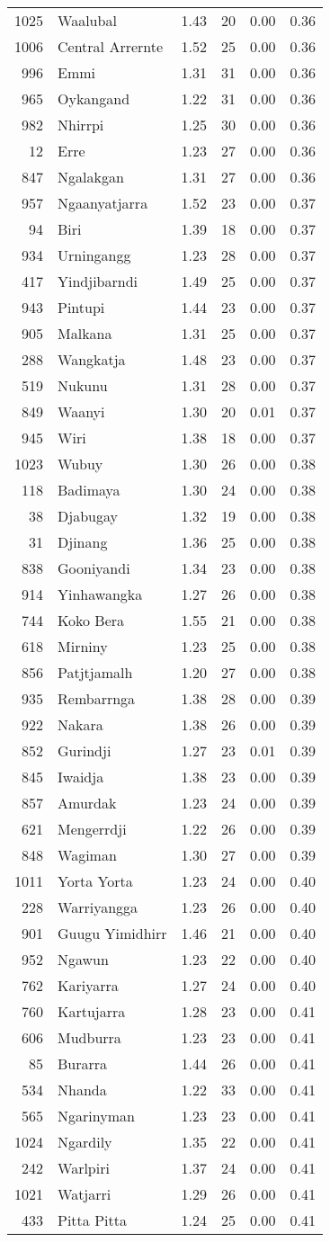\begin{longtable}[]{@{}rlrrrr@{}}
1025 & Waalubal & 1.43 & 20 & 0.00 & 0.36\tabularnewline
1006 & Central Arrernte & 1.52 & 25 & 0.00 & 0.36\tabularnewline
996 & Emmi & 1.31 & 31 & 0.00 & 0.36\tabularnewline
965 & Oykangand & 1.22 & 31 & 0.00 & 0.36\tabularnewline
982 & Nhirrpi & 1.25 & 30 & 0.00 & 0.36\tabularnewline
12 & Erre & 1.23 & 27 & 0.00 & 0.36\tabularnewline
847 & Ngalakgan & 1.31 & 27 & 0.00 & 0.36\tabularnewline
957 & Ngaanyatjarra & 1.52 & 23 & 0.00 & 0.37\tabularnewline
94 & Biri & 1.39 & 18 & 0.00 & 0.37\tabularnewline
934 & Urningangg & 1.23 & 28 & 0.00 & 0.37\tabularnewline
417 & Yindjibarndi & 1.49 & 25 & 0.00 & 0.37\tabularnewline
943 & Pintupi & 1.44 & 23 & 0.00 & 0.37\tabularnewline
905 & Malkana & 1.31 & 25 & 0.00 & 0.37\tabularnewline
288 & Wangkatja & 1.48 & 23 & 0.00 & 0.37\tabularnewline
519 & Nukunu & 1.31 & 28 & 0.00 & 0.37\tabularnewline
849 & Waanyi & 1.30 & 20 & 0.01 & 0.37\tabularnewline
945 & Wiri & 1.38 & 18 & 0.00 & 0.37\tabularnewline
1023 & Wubuy & 1.30 & 26 & 0.00 & 0.38\tabularnewline
118 & Badimaya & 1.30 & 24 & 0.00 & 0.38\tabularnewline
38 & Djabugay & 1.32 & 19 & 0.00 & 0.38\tabularnewline
31 & Djinang & 1.36 & 25 & 0.00 & 0.38\tabularnewline
838 & Gooniyandi & 1.34 & 23 & 0.00 & 0.38\tabularnewline
914 & Yinhawangka & 1.27 & 26 & 0.00 & 0.38\tabularnewline
744 & Koko Bera & 1.55 & 21 & 0.00 & 0.38\tabularnewline
618 & Mirniny & 1.23 & 25 & 0.00 & 0.38\tabularnewline
856 & Patjtjamalh & 1.20 & 27 & 0.00 & 0.38\tabularnewline
935 & Rembarrnga & 1.38 & 28 & 0.00 & 0.39\tabularnewline
922 & Nakara & 1.38 & 26 & 0.00 & 0.39\tabularnewline
852 & Gurindji & 1.27 & 23 & 0.01 & 0.39\tabularnewline
845 & Iwaidja & 1.38 & 23 & 0.00 & 0.39\tabularnewline
857 & Amurdak & 1.23 & 24 & 0.00 & 0.39\tabularnewline
621 & Mengerrdji & 1.22 & 26 & 0.00 & 0.39\tabularnewline
848 & Wagiman & 1.30 & 27 & 0.00 & 0.39\tabularnewline
1011 & Yorta Yorta & 1.23 & 24 & 0.00 & 0.40\tabularnewline
228 & Warriyangga & 1.23 & 26 & 0.00 & 0.40\tabularnewline
901 & Guugu Yimidhirr & 1.46 & 21 & 0.00 & 0.40\tabularnewline
952 & Ngawun & 1.23 & 22 & 0.00 & 0.40\tabularnewline
762 & Kariyarra & 1.27 & 24 & 0.00 & 0.40\tabularnewline
760 & Kartujarra & 1.28 & 23 & 0.00 & 0.41\tabularnewline
606 & Mudburra & 1.23 & 23 & 0.00 & 0.41\tabularnewline
85 & Burarra & 1.44 & 26 & 0.00 & 0.41\tabularnewline
534 & Nhanda & 1.22 & 33 & 0.00 & 0.41\tabularnewline
565 & Ngarinyman & 1.23 & 23 & 0.00 & 0.41\tabularnewline
1024 & Ngardily & 1.35 & 22 & 0.00 & 0.41\tabularnewline
242 & Warlpiri & 1.37 & 24 & 0.00 & 0.41\tabularnewline
1021 & Watjarri & 1.29 & 26 & 0.00 & 0.41\tabularnewline
433 & Pitta Pitta & 1.24 & 25 & 0.00 & 0.41\tabularnewline

\end{longtable}
